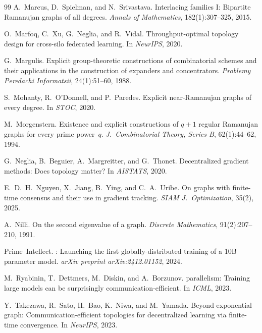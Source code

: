 \documentclass{article}
\begin{document}
\begin{thebibliography}{99}
A.~Marcus, D.~Spielman, and N.~Srivastava.
\newblock Interlacing families {I}: Bipartite {R}amanujan graphs of all degrees.
\newblock \emph{Annals of Mathematics}, 182(1):307--325, 2015.

O.~Marfoq, C.~Xu, G.~Neglia, and R.~Vidal.
\newblock Throughput-optimal topology design for cross-silo federated learning.
\newblock In \emph{NeurIPS}, 2020.

G.~Margulis.
\newblock Explicit group-theoretic constructions of combinatorial schemes and their applications in the construction of expanders and concentrators.
\newblock \emph{Problemy Peredachi Informatsii}, 24(1):51--60, 1988.

S.~Mohanty, R.~O'Donnell, and P.~Paredes.
\newblock Explicit near-{R}amanujan graphs of every degree.
\newblock In \emph{STOC}, 2020.

M.~Morgenstern.
\newblock Existence and explicit constructions of $q+1$ regular {R}amanujan graphs for every prime power~$q$.
\newblock \emph{J.\ Combinatorial Theory, Series B}, 62(1):44--62, 1994.

G.~Neglia, B.~Beguier, A.~Margreitter, and G.~Thonet.
\newblock Decentralized gradient methods: Does topology matter?
\newblock In \emph{AISTATS}, 2020.

E.~D.~H.~Nguyen, X.~Jiang, B.~Ying, and C.~A.~Uribe.
\newblock On graphs with finite-time consensus and their use in gradient tracking.
\newblock \emph{SIAM J.\ Optimization}, 35(2), 2025.

A.~Nilli.
\newblock On the second eigenvalue of a graph.
\newblock \emph{Discrete Mathematics}, 91(2):207--210, 1991.

Prime~Intellect.
: Launching the first globally-distributed training of a 10{B} parameter model.
\newblock \emph{arXiv preprint arXiv:2412.01152}, 2024.

M.~Ryabinin, T.~Dettmers, M.~Diskin, and A.~Borzunov.
 parallelism: Training large models can be surprisingly communication-efficient.
\newblock In \emph{ICML}, 2023.

Y.~Takezawa, R.~Sato, H.~Bao, K.~Niwa, and M.~Yamada.
\newblock Beyond exponential graph: Communication-efficient topologies for decentralized learning via finite-time convergence.
\newblock In \emph{NeurIPS}, 2023.


\end{thebibliography}
\end{document}
